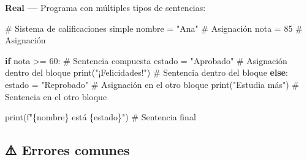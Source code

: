 \documentclass[
  doc,
  floatsintext,
  longtable,
  a4paper,
  nolmodern,
  notxfonts,
  notimes,
  12pt,
  colorlinks=true,linkcolor=blue,citecolor=blue,urlcolor=blue]{apa7}
\newenvironment{Shaded}{\begin{snugshade}}{\end{snugshade}}
\newcommand{\BuiltInTok}[1]{\textcolor[rgb]{0.00,0.23,0.31}{#1}}
\newcommand{\CommentTok}[1]{\textcolor[rgb]{0.37,0.37,0.37}{#1}}
\newcommand{\ControlFlowTok}[1]{\textcolor[rgb]{0.00,0.23,0.31}{\textbf{#1}}}
\newcommand{\DecValTok}[1]{\textcolor[rgb]{0.68,0.00,0.00}{#1}}
\newcommand{\NormalTok}[1]{\textcolor[rgb]{0.00,0.23,0.31}{#1}}
\newcommand{\OperatorTok}[1]{\textcolor[rgb]{0.37,0.37,0.37}{#1}}
\newcommand{\SpecialCharTok}[1]{\textcolor[rgb]{0.37,0.37,0.37}{#1}}
\newcommand{\SpecialStringTok}[1]{\textcolor[rgb]{0.13,0.47,0.30}{#1}}
\newcommand{\StringTok}[1]{\textcolor[rgb]{0.13,0.47,0.30}{#1}}
\begin{document}
\textbf{Real ---} Programa con múltiples tipos de sentencias:

\begin{Shaded}
\begin{Highlighting}[]
\CommentTok{\# Sistema de calificaciones simple}
\NormalTok{nombre }\OperatorTok{=} \StringTok{"Ana"}              \CommentTok{\# Asignación}
\NormalTok{nota }\OperatorTok{=} \DecValTok{85}                   \CommentTok{\# Asignación}

\ControlFlowTok{if}\NormalTok{ nota }\OperatorTok{\textgreater{}=} \DecValTok{60}\NormalTok{:              }\CommentTok{\# Sentencia compuesta}
\NormalTok{    estado }\OperatorTok{=} \StringTok{"Aprobado"}     \CommentTok{\# Asignación dentro del bloque}
    \BuiltInTok{print}\NormalTok{(}\StringTok{"¡Felicidades!"}\NormalTok{)  }\CommentTok{\# Sentencia dentro del bloque}
\ControlFlowTok{else}\NormalTok{:}
\NormalTok{    estado }\OperatorTok{=} \StringTok{"Reprobado"}    \CommentTok{\# Asignación en el otro bloque}
    \BuiltInTok{print}\NormalTok{(}\StringTok{"Estudia más"}\NormalTok{)    }\CommentTok{\# Sentencia en el otro bloque}

\BuiltInTok{print}\NormalTok{(}\SpecialStringTok{f"}\SpecialCharTok{\{}\NormalTok{nombre}\SpecialCharTok{\}}\SpecialStringTok{ está }\SpecialCharTok{\{}\NormalTok{estado}\SpecialCharTok{\}}\SpecialStringTok{"}\NormalTok{)  }\CommentTok{\# Sentencia final}
\end{Highlighting}
\end{Shaded}

\subsection{⚠️ Errores comunes}\label{errores-comunes}
\end{document}
